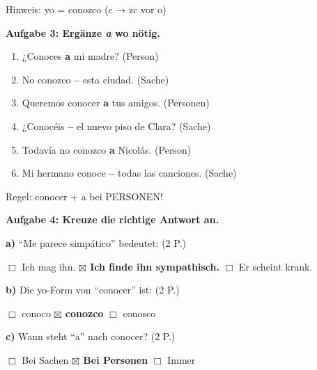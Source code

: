 \documentclass[11pt,a4paper]{article}
\newcommand{\lsg}[1]{\textcolor{loesung}{\textbf{#1}}}
\newcommand{\punktebox}[1]{\hfill\fbox{\small \_/#1}}
\begin{document}
\textcolor{loesung}{\small Hinweis: yo = conozco (c → zc vor o)}

\vspace{0.5cm}

\textbf{Aufgabe 3: Ergänze \textit{a} wo nötig.} \punktebox{6}

\begin{enumerate}[label=\alph)]
    \item ¿Conoces \lsg{a} mi madre? \textcolor{loesung}{\small (Person)}
    \item No conozco \lsg{--} esta ciudad. \textcolor{loesung}{\small (Sache)}
    \item Queremos conocer \lsg{a} tus amigos. \textcolor{loesung}{\small (Personen)}
    \item ¿Conocéis \lsg{--} el nuevo piso de Clara? \textcolor{loesung}{\small (Sache)}
    \item Todavía no conozco \lsg{a} Nicolás. \textcolor{loesung}{\small (Person)}
    \item Mi hermano conoce \lsg{--} todas las canciones. \textcolor{loesung}{\small (Sache)}
\end{enumerate}

\textcolor{loesung}{\small Regel: conocer + a bei PERSONEN!}

\vspace{0.5cm}

\textbf{Aufgabe 4: Kreuze die richtige Antwort an.} \punktebox{6}

\textbf{a)} ``Me parece simpático'' bedeutet: \hfill (2 P.)

$\Box$ Ich mag ihn. \hspace{0.5cm} \lsg{$\boxtimes$ Ich finde ihn sympathisch.} \hspace{0.5cm} $\Box$ Er scheint krank.

\vspace{0.3cm}

\textbf{b)} Die yo-Form von ``conocer'' ist: \hfill (2 P.)

$\Box$ conoco \hspace{1cm} \lsg{$\boxtimes$ conozco} \hspace{1cm} $\Box$ conosco

\vspace{0.3cm}

\textbf{c)} Wann steht ``a'' nach conocer? \hfill (2 P.)

$\Box$ Bei Sachen \hspace{0.5cm} \lsg{$\boxtimes$ Bei Personen} \hspace{0.5cm} $\Box$ Immer
\end{document}
